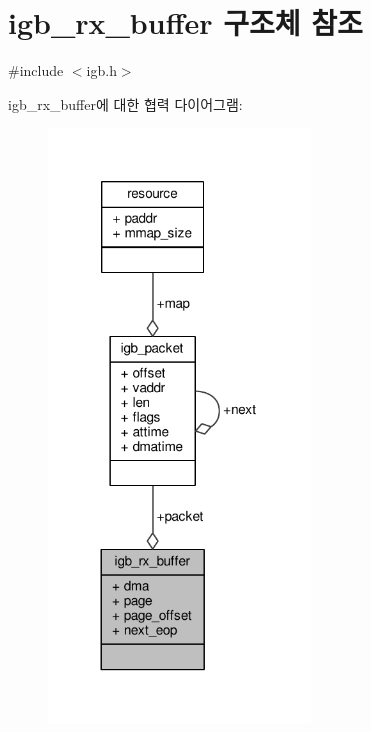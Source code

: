 \hypertarget{structigb__rx__buffer}{}\section{igb\+\_\+rx\+\_\+buffer 구조체 참조}
\label{structigb__rx__buffer}


{\ttfamily \#include $<$igb.\+h$>$}



igb\+\_\+rx\+\_\+buffer에 대한 협력 다이어그램\+:
\nopagebreak
\begin{figure}[H]
\begin{center}
\leavevmode
\includegraphics[width=197pt]{structigb__rx__buffer__coll__graph}
\end{center}
\end{figure}
